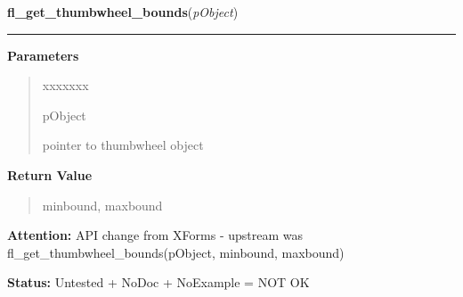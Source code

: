\hspace{.8\funcindent}\begin{boxedminipage}{\funcwidth}

    \raggedright \textbf{fl\_get\_thumbwheel\_bounds}(\textit{pObject})

    \vspace{-1.5ex}

    \rule{\textwidth}{0.5\fboxrule}
\setlength{\parskip}{2ex}
\setlength{\parskip}{1ex}
      \textbf{Parameters}
      \vspace{-1ex}

      \begin{quote}
        \begin{Ventry}{xxxxxxx}

          \item[pObject]

          pointer to thumbwheel object

        \end{Ventry}

      \end{quote}

      \textbf{Return Value}
    \vspace{-1ex}

      \begin{quote}
      minbound, maxbound

      \end{quote}

\textbf{Attention:} API change from XForms - upstream was fl\_get\_thumbwheel\_bounds(pObject, 
minbound, maxbound)



\textbf{Status:} Untested + NoDoc + NoExample = NOT OK



    \end{boxedminipage}

    \label{xformslib:library:fl_add_thumbwheel}

    \vspace{0.5ex}


